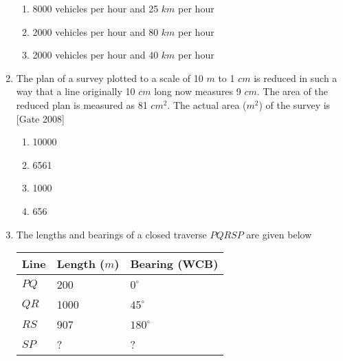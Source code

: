 \documentclass[journal]{IEEEtran}
\begin{document}
\begin{enumerate}
\begin{multicols}{2}
\begin{enumerate}
		\item 8000 vehicles per hour and 25 $km$ per hour
		\item 2000 vehicles per hour and 80 $km$ per hour
		\item 2000 vehicles per hour and 40 $km$ per hour
	\end{enumerate}
\end{multicols}	
	\item The plan of a survey plotted to a scale of 10 $m$ to 1 $cm$ is reduced in such a way that a line originally 10 $cm$ long now measures 9 $cm$. The area of the reduced plan is measured as 81 $cm^2$. The actual area ($m^2$) of the survey is \hfill [Gate 2008]
\begin{multicols}{2}
	\begin{enumerate}
		\item 10000
		\item 6561
		\item 1000
		\item 656
	\end{enumerate}
\end{multicols}	
	\item The lengths and bearings of a closed traverse $PQRSP$ are given below 
		\begin{table}[h]
	\centering
\begin{tabular}{|l|l|l|}
	\hline
	 Line & Length ($m$)   &  Bearing (WCB)  \\

	\hline
	$PQ$ & 200 & $0^{\circ}$   \\
	\hline
	$QR$ & 1000  &$45^{\circ}$  \\
	\hline
	$RS$ & 907 & $180^{\circ}$  \\
	\hline
	 $SP$  & ?  & ?  \\
	\hline
	



\end{tabular} 
\end{table}
		

\end{enumerate}
\end{document}
